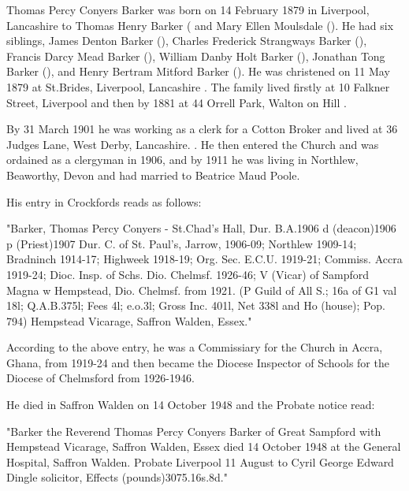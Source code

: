 
 Thomas Percy Conyers Barker was born on 14 February 1879 in Liverpool, Lancashire to Thomas Henry Barker ( and Mary Ellen Moulsdale ().  He had six siblings, James Denton Barker (), Charles Frederick Strangways Barker (),  Francis Darcy Mead Barker (), William Danby Holt Barker (),
Jonathan Tong Barker (), and Henry Bertram Mitford Barker ().
He was christened on 11 May 1879 at St.Brides, Liverpool, Lancashire  \cite{TPCBarkerBirth}. The family lived firstly at 10 Falkner Street, Liverpool  and then by 1881 at 44 Orrell Park, Walton on Hill \cite{TPCBarkerResidence}.

By 31 March 1901 he was working as a clerk for a Cotton Broker and lived at 36 Judges Lane, West Derby, Lancashire. \cite{TPCBarker1901}.  He then entered the Church and was ordained as a clergyman in 1906, and by 1911 he  was living in Northlew, Beaworthy, Devon  \cite{TPCBarker1911} and had married to Beatrice Maud Poole.

His entry in Crockfords reads as follows:

"Barker, Thomas Percy Conyers - St.Chad's Hall, Dur. B.A.1906 d (deacon)1906 p (Priest)1907 Dur. C. of St. Paul's, Jarrow, 1906-09; Northlew 1909-14; Bradninch 1914-17; Highweek 1918-19; Org. Sec. E.C.U. 1919-21; Commiss. Accra 1919-24; Dioc. Insp. of Schs. Dio. Chelmsf. 1926-46; V (Vicar) of Sampford Magna w Hempstead, Dio. Chelmsf. from 1921. (P Guild of All S.; 16a of G1 val 18l; Q.A.B.375l; Fees 4l; e.o.3l; Gross Inc. 401l, Net 338l and Ho (house); Pop. 794) Hempstead Vicarage, Saffron Walden, Essex." \cite{TPCBarkerCrockfords}

According to the above entry, he was a Commissiary for the Church in Accra, Ghana, from 1919-24 and then became the Diocese Inspector of Schools for the Diocese of Chelmsford from 1926-1946.  

He died in Saffron Walden on 14 October 1948 \cite{TPCBarkerDeath} and the Probate notice read:

"Barker the Reverend Thomas Percy Conyers Barker of Great Sampford with Hempstead Vicarage, Saffron Walden, Essex died 14 October 1948 at the General Hospital, Saffron Walden. Probate Liverpool 11 August to Cyril George Edward Dingle solicitor, Effects (pounds)3075.16s.8d." 


